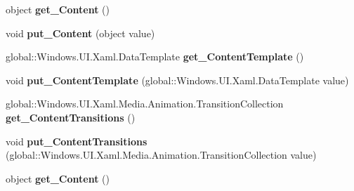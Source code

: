 \begin{DoxyCompactItemize}
\item 
\mbox{\label{interface_windows_1_1_u_i_1_1_xaml_1_1_controls_1_1_i_content_control_ab27572e586326eb57ff5e937f9ed7318}} 
object {\bfseries get\+\_\+\+Content} ()
\item 
\mbox{\label{interface_windows_1_1_u_i_1_1_xaml_1_1_controls_1_1_i_content_control_a5350840458a62ceb693e7746c04986f3}} 
void {\bfseries put\+\_\+\+Content} (object value)
\item 
\mbox{\label{interface_windows_1_1_u_i_1_1_xaml_1_1_controls_1_1_i_content_control_aa941dee35deb2872cc78a0e3bbfaa7f6}} 
global\+::\+Windows.\+U\+I.\+Xaml.\+Data\+Template {\bfseries get\+\_\+\+Content\+Template} ()
\item 
\mbox{\label{interface_windows_1_1_u_i_1_1_xaml_1_1_controls_1_1_i_content_control_ab8635fb05ae89dd2ff4d0697e5c78b84}} 
void {\bfseries put\+\_\+\+Content\+Template} (global\+::\+Windows.\+U\+I.\+Xaml.\+Data\+Template value)
\item 
\mbox{\label{interface_windows_1_1_u_i_1_1_xaml_1_1_controls_1_1_i_content_control_aa51222b3d15db7740854e4ddbad68fd3}} 
global\+::\+Windows.\+U\+I.\+Xaml.\+Media.\+Animation.\+Transition\+Collection {\bfseries get\+\_\+\+Content\+Transitions} ()
\item 
\mbox{\label{interface_windows_1_1_u_i_1_1_xaml_1_1_controls_1_1_i_content_control_a1c0aac2a725d08d1f7e467ea2dd8afd3}} 
void {\bfseries put\+\_\+\+Content\+Transitions} (global\+::\+Windows.\+U\+I.\+Xaml.\+Media.\+Animation.\+Transition\+Collection value)
\item 
\mbox{\label{interface_windows_1_1_u_i_1_1_xaml_1_1_controls_1_1_i_content_control_ab27572e586326eb57ff5e937f9ed7318}} 
object {\bfseries get\+\_\+\+Content} ()
\item 

\end{DoxyCompactItemize}
